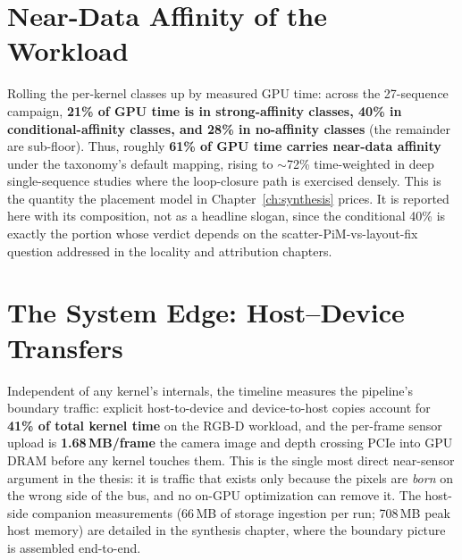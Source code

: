 \section{Near-Data Affinity of the Workload}
\label{sec:char-affinity}

Rolling the per-kernel classes up by measured GPU time: across the 27-sequence campaign, \textbf{21\% of GPU time is in strong-affinity classes, 40\% in conditional-affinity classes, and 28\% in no-affinity classes} (the remainder are sub-floor). Thus, roughly \textbf{61\% of GPU time carries near-data affinity} under the taxonomy's default mapping, rising to $\sim$72\% time-weighted in deep single-sequence studies where the loop-closure path is exercised densely. This is the quantity the placement model in Chapter~\ref{ch:synthesis} prices. It is reported here with its composition, not as a headline slogan, since the conditional 40\% is exactly the portion whose verdict depends on the scatter-PiM-vs-layout-fix question addressed in the locality and attribution chapters.

\section{The System Edge: Host--Device Transfers}
\label{sec:char-transfers}

Independent of any kernel's internals, the timeline measures the pipeline's boundary traffic: explicit host-to-device and device-to-host copies account for \textbf{41\% of total kernel time} on the RGB-D workload, and the per-frame sensor upload is \textbf{1.68\,MB/frame} the camera image and depth crossing PCIe into GPU DRAM before any kernel touches them. This is the single most direct near-sensor argument in the thesis: it is traffic that exists only because the pixels are \emph{born} on the wrong side of the bus, and no on-GPU optimization can remove it. The host-side companion measurements (66\,MB of storage ingestion per run; 708\,MB peak host memory) are detailed in the synthesis chapter, where the boundary picture is assembled end-to-end.